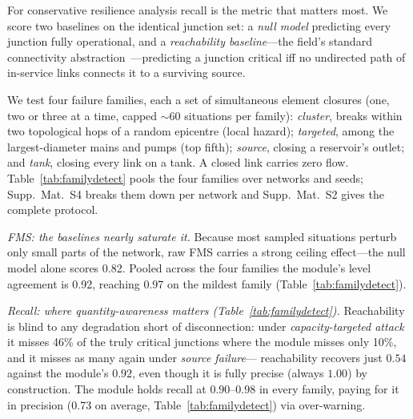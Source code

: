 \documentclass{svproc}
\begin{document}
  For conservative resilience analysis recall is the
  metric that matters most. We score two baselines on the identical junction set: a
  \emph{null model} predicting every junction fully operational, and a \emph{reachability
  baseline}---the field's standard connectivity
  abstraction~\cite{hines_topological_2010}---predicting a junction critical iff no
  undirected path of in-service links connects it to a surviving source. 

  We test four failure families, each a set of simultaneous element closures (one, two or
  three at a time, capped $\sim\!60$ situations per family): \emph{cluster}, breaks within
  two topological hops of a random epicentre (local hazard);
  \emph{targeted}, among the largest-diameter mains and pumps (top fifth); \emph{source},
  closing a reservoir's outlet; and \emph{tank}, closing every link on a tank. A closed
  link carries zero flow. Table~\ref{tab:familydetect} pools the four
  families over networks and seeds; Supp.~Mat.~S4 breaks them down per network and
  Supp.~Mat.~S2 gives the complete protocol.

  \emph{FMS: the baselines nearly saturate it.} Because most sampled
  situations perturb only small parts of the network, raw FMS carries a strong ceiling
  effect---the null model alone scores 0.82. Pooled across the four families the
  module's level agreement is 0.92, reaching 0.97 on the mildest family
  (Table~\ref{tab:familydetect}).

  \emph{Recall: where quantity-awareness matters
  (Table~\ref{tab:familydetect}).} Reachability is blind to any degradation short of
  disconnection: under \emph{capacity-targeted attack} it misses 46\% of the truly
  critical junctions where the module misses only 10\%, and it misses as many again
  under \emph{source failure}--- reachability recovers just $0.54$
  against the module's $0.92$, even though it is fully precise (always $1.00$) by
  construction. The module holds recall at $0.90$--$0.98$ in every family, paying for
  it in precision (0.73 on average, Table~\ref{tab:familydetect}) via over-warning.
\end{document}

